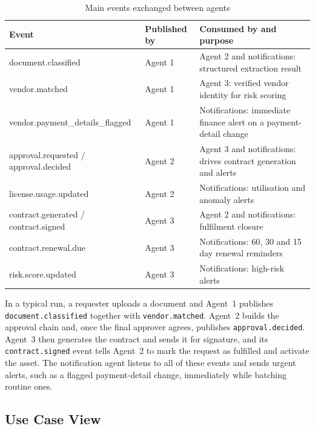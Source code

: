 \begin{table}[!htbp]
\centering
\footnotesize
\renewcommand{\arraystretch}{1.2}
\caption{Main events exchanged between agents}
\label{tab:events}
\begin{tabular}{|p{}|p{}|p{}|}
\hline
\raggedright \textbf{Event} & \raggedright \textbf{Published by} & \raggedright \textbf{Consumed by and purpose} \tabularnewline \hline
\raggedright document.classified & \raggedright Agent 1 & \raggedright Agent 2 and notifications: structured extraction result \tabularnewline \hline
\raggedright vendor.matched & \raggedright Agent 1 & \raggedright Agent 3: verified vendor identity for risk scoring \tabularnewline \hline
\raggedright vendor.payment\_\allowbreak details\_\allowbreak flagged & \raggedright Agent 1 & \raggedright Notifications: immediate finance alert on a payment-detail change \tabularnewline \hline
\raggedright approval.requested / approval.decided & \raggedright Agent 2 & \raggedright Agent 3 and notifications: drives contract generation and alerts \tabularnewline \hline
\raggedright license.usage.updated & \raggedright Agent 2 & \raggedright Notifications: utilisation and anomaly alerts \tabularnewline \hline
\raggedright contract.generated / contract.signed & \raggedright Agent 3 & \raggedright Agent 2 and notifications: fulfilment closure \tabularnewline \hline
\raggedright contract.renewal.due & \raggedright Agent 3 & \raggedright Notifications: 60, 30 and 15 day renewal reminders \tabularnewline \hline
\raggedright risk.score.updated & \raggedright Agent 3 & \raggedright Notifications: high-risk alerts \tabularnewline \hline
\end{tabular}
\end{table}

{\sloppy In a typical run, a requester uploads a document and Agent~1 publishes \texttt{document.classified} together with \texttt{vendor.matched}. Agent~2 builds the approval chain and, once the final approver agrees, publishes \texttt{approval.decided}. Agent~3 then generates the contract and sends it for signature, and its \texttt{contract.signed} event tells Agent~2 to mark the request as fulfilled and activate the asset. The notification agent listens to all of these events and sends urgent alerts, such as a flagged payment-detail change, immediately while batching routine ones.\par}

\subsection{Use Case View}

